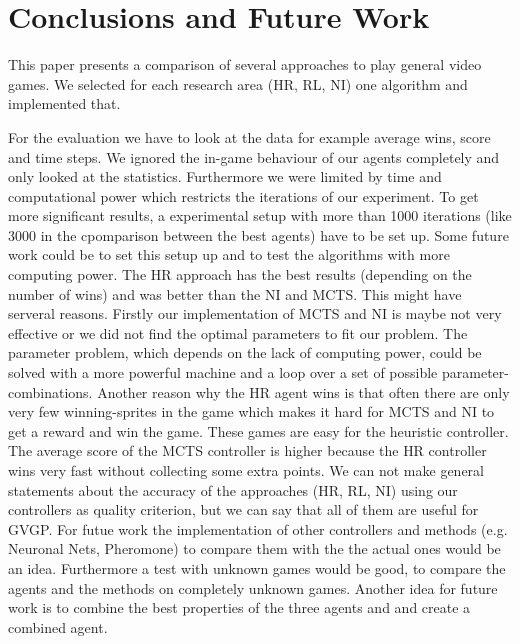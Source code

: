 \section{Conclusions and Future Work} 
\label{sec:conc}

This paper presents a comparison of several approaches to play general video games. We selected for each research area (\ac{HR}, \ac{RL}, \ac{NI})
one algorithm and implemented that. 


For the evaluation we have to look at the data for example average wins, score and time steps.
We ignored the in-game behaviour of our agents completely and only looked at the statistics. 
Furthermore we were limited by time and computational power which restricts the iterations of our experiment. 
To get more significant results, a experimental setup with more than 1000 iterations (like 3000 in the cpomparison between the best agents) have to be set up.
Some future work could be to set this setup up and to test the algorithms with more computing power.  
The \ac{HR} approach has the best results (depending on the number of wins) and was better than the \ac{NI} and \ac{MCTS}. This might have serveral reasons. Firstly our implementation of \ac{MCTS} and \ac{NI} is maybe not very effective or we did not find the optimal parameters to fit our problem. The parameter problem, which depends on the lack of computing power, could be solved with a more powerful machine and a loop over a set of possible parameter-combinations.
Another reason why the \ac{HR} agent wins is that often there are only very few winning-sprites in the game which makes it hard for \ac{MCTS} and \ac{NI} to get a reward and win the game. These games are easy for the heuristic controller. The average score of the \ac{MCTS} controller is higher because the \ac{HR} controller wins very fast without collecting some extra points. 
We can not make general statements about the accuracy of the approaches (\acs{HR}, \acs{RL}, \acs{NI}) using our controllers as quality criterion, but we can say that all of them are useful for \ac{GVGP}.
For futue work the implementation of other controllers and methods (e.g. Neuronal Nets, Pheromone) to compare them with the the actual ones would be an idea. Furthermore a test with unknown games would be good, to compare the agents and the methods on completely unknown games.
Another idea for future work is to combine the best properties of the three agents and and create a combined agent.

